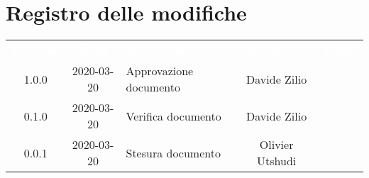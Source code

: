\section*{Registro delle modifiche}
{
	\centering
	\begin{longtable}{ c c  C{4cm}  c  c }
		\textcolor{white}{\textbf{Versione}} & \textcolor{white}{\textbf{Data}} & \textcolor{white}{\textbf{Descrizione}} & \textcolor{white}{\textbf{Nominativo}} & \textcolor{white}{\textbf{Ruolo}}\\		
		1.0.0 & 2020-03-20 & Approvazione documento & Davide Zilio &\RdP{}\\		
		0.1.0 & 2020-03-20 & Verifica documento & Davide Zilio &\ver{}\\		
		0.0.1 & 2020-03-20 & Stesura documento & Olivier Utshudi &\reda{}\\		
		
	\end{longtable}

}